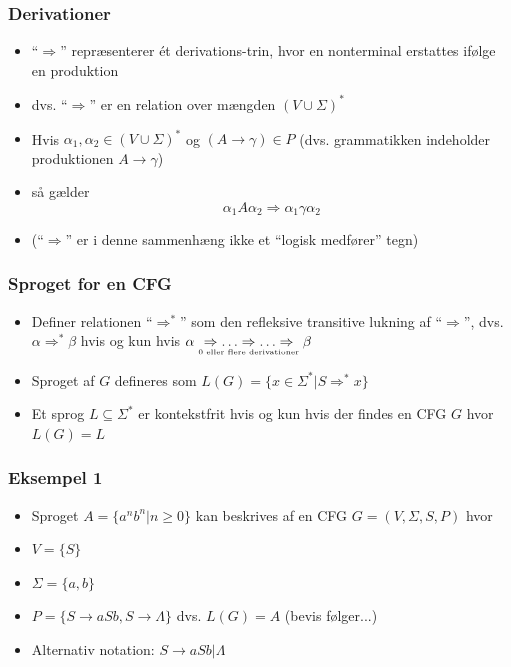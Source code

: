 \documentclass{beamer}
\begin{document}
\begin{frame}
\frametitle{Derivationer}

\begin{itemize}[<+->]
\item ``$\Rightarrow$'' repræsenterer ét derivations-trin, hvor 
      en nonterminal erstattes ifølge en produktion
    \item dvs. ``$\Rightarrow$'' er en relation over mængden $(V\cup \Sigma )^*$
    \item Hvis $\alpha_1,\alpha_2\in (V\cup \Sigma )^*$ og $(A \rightarrow  \gamma)\in P$
      (dvs. grammatikken indeholder produktionen  $A \rightarrow  \gamma$)
\item så gælder
        \[\alpha_1 A \alpha_2 \Rightarrow  \alpha_1\gamma\alpha_2\]

\item (``$\Rightarrow$'' er i denne sammenhæng ikke et “logisk medfører” tegn)
\end{itemize}
\end{frame}

\begin{frame}
\frametitle{Sproget for en CFG}
\begin{itemize}[<+->]
\item Definer relationen ``$\Rightarrow^*$'' som den refleksive  
transitive lukning af “$\Rightarrow$”, dvs. 
$\alpha \Rightarrow^* \beta$   hvis og kun hvis   $\alpha \underset{\text{\tiny{0 eller flere derivationer}}}{\Rightarrow \ldots \Rightarrow \ldots \Rightarrow} \beta$

\item  Sproget af $G$ defineres som 
$L(G) = \{ x\in\Sigma^*  |  S \Rightarrow^* x \} $
\item  Et sprog $L\subseteq\Sigma^*$ er kontekstfrit  
hvis og kun hvis  
der findes en CFG $G$ hvor $L(G)=L$ 
\end{itemize}
\end{frame}

\begin{frame}
\frametitle{Eksempel 1}
\begin{itemize}[<+->]
\item Sproget $A = \{ a^nb^n  | n\geq 0 \}$  kan beskrives 
af en CFG $G=(V,\Sigma,S,P)$ hvor 
\item $V = \{S\}$ 
\item $\Sigma = \{a,b\}$ 
\item $P = \{S \rightarrow aSb,  S \rightarrow \Lambda\}$ 
dvs. $L(G) = A$   (bevis følger...)
\item Alternativ notation: 
$S \rightarrow aSb | \Lambda$
\end{itemize}
\end{frame}
\end{document}
